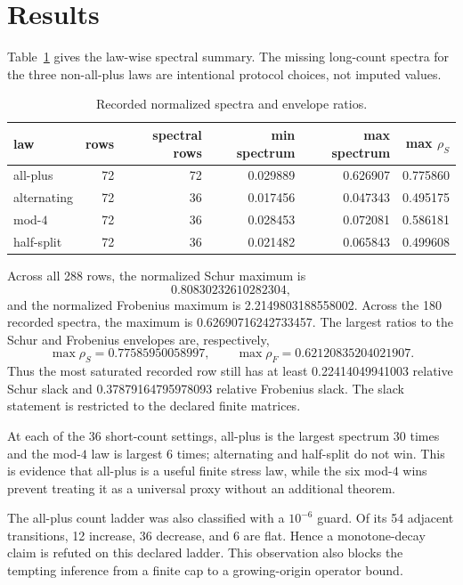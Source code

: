 \documentclass[10pt]{article}
\begin{document}
\section{Results}

Table~\ref{tab:summary} gives the law-wise spectral summary.  The missing
long-count spectra for the three non-all-plus laws are intentional protocol
choices, not imputed values.

\begin{table}[t]
\centering
\caption{Recorded normalized spectra and envelope ratios.}
\label{tab:summary}
\small
\begin{tabular}{lrrrrr}
\toprule
law & rows & spectral rows & min spectrum & max spectrum & max $\rho_S$\\
\midrule
all-plus & 72 & 72 & 0.029889 & 0.626907 & 0.775860\\
alternating & 72 & 36 & 0.017456 & 0.047343 & 0.495175\\
mod-$4$ & 72 & 36 & 0.028453 & 0.072081 & 0.586181\\
half-split & 72 & 36 & 0.021482 & 0.065843 & 0.499608\\
\bottomrule
\end{tabular}
\end{table}

Across all 288 rows, the normalized Schur maximum is
\[
 0.80830232610282304,
\]
and the normalized Frobenius maximum is 2.2149803188558002.  Across the 180
recorded spectra, the maximum is 0.62690716242733457.  The largest ratios to
the Schur and Frobenius envelopes are, respectively,
\[
 \max\rho_S=0.77585950058997,
 \qquad
 \max\rho_F=0.62120835204021907.
\]
Thus the most saturated recorded row still has at least 0.22414049941003
relative Schur slack and 0.37879164795978093 relative Frobenius slack.  The
slack statement is restricted to the declared finite matrices.

At each of the 36 short-count settings, all-plus is the largest spectrum 30
times and the mod-$4$ law is largest 6 times; alternating and half-split do
not win.  This is evidence that all-plus is a useful finite stress law, while
the six mod-$4$ wins prevent treating it as a universal proxy without an
additional theorem.

The all-plus count ladder was also classified with a $10^{-6}$ guard.  Of its
54 adjacent transitions, 12 increase, 36 decrease, and 6 are flat.  Hence a
monotone-decay claim is refuted on this declared ladder.  This observation
also blocks the tempting inference from a finite cap to a growing-origin
operator bound.
\end{document}
